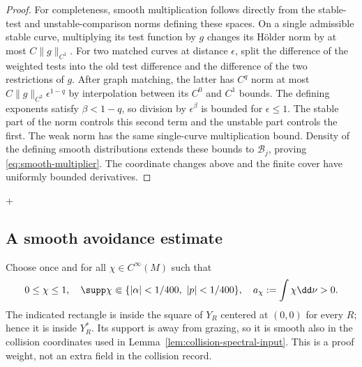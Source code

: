 \begin{proof}
For completeness, smooth multiplication follows directly from the
stable-test and unstable-comparison norms defining these spaces. On a
single admissible stable curve, multiplying its test function by $g$
changes its H\"older norm by at most $C\|g\|_{C^1}$. For two matched
curves at distance $\epsilon$, split the difference of the weighted tests
into the old test difference and the difference of the two restrictions
of $g$. After graph matching, the latter has $C^q$ norm at most
$C\|g\|_{C^2}\epsilon^{1-q}$ by interpolation between its $C^0$ and
$C^1$ bounds. The defining exponents satisfy $\beta<1-q$, so division
by $\epsilon^\beta$ is bounded for $\epsilon\le1$. The stable part of the
norm controls this second term and the unstable part controls the first.
The weak norm has the same single-curve multiplication bound. Density of
the defining smooth distributions extends these bounds to
$\mathcal B_j$, proving \eqref{eq:smooth-multiplier}. The coordinate
changes above and the finite cover have uniformly bounded derivatives.
\end{proof}+
\subsection{A smooth avoidance estimate}
Choose once and for all $\chi\in C^\infty(M)$ such that
\begin{equation}\label{eq:fixed-killing-weight}
 0\le\chi\le1,\quad
 \supp\chi\Subset\{ |\alpha|<1/400,\ |p|<1/400\},\quad
 a_\chi:=\int\chi\dd\nu>0.
\end{equation}
The indicated rectangle is inside the square of $Y_R$ centered at
$(0,0)$ for every $R$; hence it is inside $Y_R^*$. Its support is away
from grazing, so it is smooth also in the collision coordinates used in
Lemma~\ref{lem:collision-spectral-input}. This is a proof weight, not an
extra field in the collision record.

